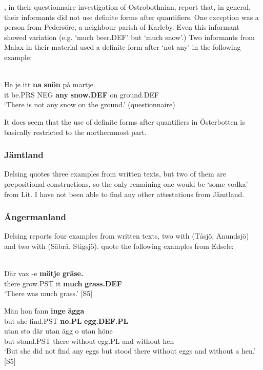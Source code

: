 \z

\citet[26]{ErikssonEtAl1999}, in their questionnaire investigation of Ostrobothnian, report that, in general, their informants did not use definite forms after quantifiers. One exception was a person from Pedersöre, a neighbour parish of Karleby. Even this informant showed variation (e.g.  ‘much beer.DEF’ but  ‘much snow’.) Two informants from Malax in their material used a definite form after  ‘not any’ in the following example:

\ea \label{} 
\\
\gll He  je  itt  \textbf{na} \textbf{snön} på  martje.\\
it  be.PRS  NEG  \textbf{any} \textbf{snow.DEF} on  ground.DEF\\
\glt ‘There is not any snow on the ground.’ (questionnaire)

\z

It does seem that the use of definite forms after quantifiers in Österbotten is basically restricted to the northernmost part.

\subsubsection{Jämtland}
Delsing quotes three examples from written texts, but two of them are prepositional constructions, so the only remaining one would be  ‘some vodka’ from Lit. I have not been able to find any other attestations from Jämtland.

\subsubsection{Ångermanland}
 Delsing reports four examples from written texts, two with  (Tåsjö, Anundsjö) and two with (Säbrå, Stigsjö). \citet{WälchliEtAl1998} quote the following examples from Edsele:

\ea\label{}
\\
\gll Där  vax  {}-e  \textbf{mötje} \textbf{  gräse.}\\
there  grow.PST  it  \textbf{much} \textbf{grass.DEF}\\
\glt ‘There was much grass.’ [S5]

\z

\ea
\gll Män  hon  fann  \textbf{inge} \textbf{ägga}\\
but  she  find.PST  \textbf{no.PL} \textbf{egg.DEF.PL}\\
\gll utan  sto  där  utan  ägg  o  utan  höne\\
but  stand.PST  there  without  egg.PL  and  without  hen\\
\glt ‘But she did not find any eggs but stood there without eggs and without a hen.’ [S5]

